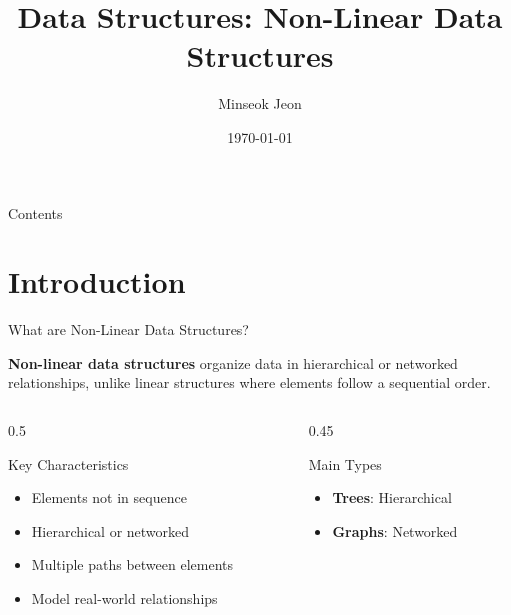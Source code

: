 \documentclass[aspectratio=169,xcolor=dvipsnames]{beamer}
\title[Non-Linear Data Structures]{Data Structures: Non-Linear Data Structures}
\author{Minseok Jeon}
\institute{DGIST}
\date{\today}
\begin{document}
\begin{frame}[plain]
  \titlepage
\end{frame}

\begin{frame}[plain]{Contents}
  \tableofcontents
\end{frame}

\section{Introduction}

\begin{frame}{What are Non-Linear Data Structures?}
  \begin{definition}
    \textbf{Non-linear data structures} organize data in hierarchical or networked relationships, unlike linear structures where elements follow a sequential order.
  \end{definition}

  \vspace{0.5cm}

  \begin{columns}
    \begin{column}{0.5\textwidth}
      \begin{block}{Key Characteristics}
        \begin{itemize}
          \item Elements not in sequence
          \item Hierarchical or networked
          \item Multiple paths between elements
          \item Model real-world relationships
        \end{itemize}
      \end{block}
    \end{column}
    \begin{column}{0.45\textwidth}
      \begin{block}{Main Types}
        \begin{itemize}
          \item \textbf{Trees}: Hierarchical
          \item \textbf{Graphs}: Networked
        \end{itemize}
      \end{block}
    \end{column}
  \end{columns}
\end{frame}
\end{document}
